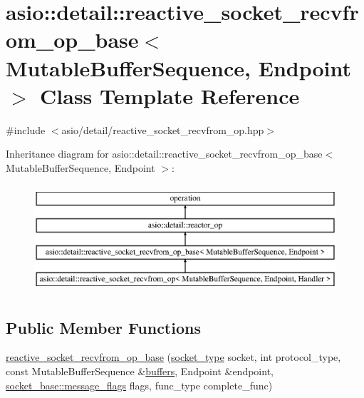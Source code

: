 \hypertarget{classasio_1_1detail_1_1reactive__socket__recvfrom__op__base}{}\section{asio\+:\+:detail\+:\+:reactive\+\_\+socket\+\_\+recvfrom\+\_\+op\+\_\+base$<$ Mutable\+Buffer\+Sequence, Endpoint $>$ Class Template Reference}
\label{classasio_1_1detail_1_1reactive__socket__recvfrom__op__base}


{\ttfamily \#include $<$asio/detail/reactive\+\_\+socket\+\_\+recvfrom\+\_\+op.\+hpp$>$}

Inheritance diagram for asio\+:\+:detail\+:\+:reactive\+\_\+socket\+\_\+recvfrom\+\_\+op\+\_\+base$<$ Mutable\+Buffer\+Sequence, Endpoint $>$\+:\begin{figure}[H]
\begin{center}
\leavevmode
\includegraphics[height=4.000000cm]{classasio_1_1detail_1_1reactive__socket__recvfrom__op__base}
\end{center}
\end{figure}
\subsection*{Public Member Functions}
\begin{DoxyCompactItemize}
\item 
\hyperlink{classasio_1_1detail_1_1reactive__socket__recvfrom__op__base_a19f1ee615567314a7c4ae94dbd9c24da}{reactive\+\_\+socket\+\_\+recvfrom\+\_\+op\+\_\+base} (\hyperlink{namespaceasio_1_1detail_a6798c771dd84b79798b1a08150706ea9}{socket\+\_\+type} socket, int protocol\+\_\+type, const Mutable\+Buffer\+Sequence \&\hyperlink{group__async__read_ga54dede45c3175148a77fe6635222c47d}{buffers}, Endpoint \&endpoint, \hyperlink{classasio_1_1socket__base_ac3cf77465dfedfe1979b5415cf32cc94}{socket\+\_\+base\+::message\+\_\+flags} flags, func\+\_\+type complete\+\_\+func)
\end{DoxyCompactItemize}
